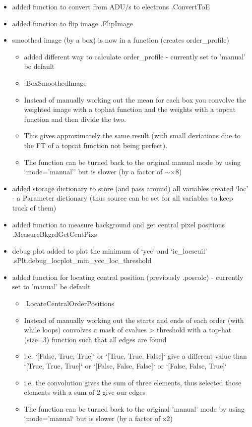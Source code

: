 \begin{itemize}

\item added function to convert from ADU/s to electrons \spirouImage.ConvertToE
    
\item added function to flip image \spirouImage.FlipImage

\item smoothed image (by a box) is now in a function (creates order\_profile)
	\begin{itemize}
	\item added different way to calculate order\_profile - currently set to 'manual' be default
	\item \spirouLOCOR.BoxSmoothedImage 
	\item Instead of manually working out the mean for each box you convolve the weighted image with a tophat function and the weights with a topcat function and then divide the two.
	\item This gives approximately the same result (with small deviations due to the FT of a topcat function not being perfect).
	\item The function can be turned back to the original manual mode by using `mode='manual'' but is slower (by a factor of $\sim\times$8)
	\end{itemize}

\item added storage dictionary to store (and pass around) all variables created `loc' - a Parameter dictionary (thus source can be set for all variables to keep track of them)

\item added function to measure background and get central pixel positions \spirouLOCOR.MeasureBkgrdGetCentPixs

\item debug plot added to plot the minimum of `ycc' and `ic\_locseuil' \spirouPlot.sPlt.debug\_locplot\_min\_ycc\_loc\_threshold

\item added function for locating central position (previously \spirouLOCOR.poscolc) - currently set to 'manual' be default
    \begin{itemize}
    \item \spirouLOCOR.LocateCentralOrderPositions
    \item  Instead of manually working out the starts and ends of each order (with while loops) convolves a mask of cvalues > threshold with a top-hat (size=3) function such that all edges are found
    \item i.e. `[False, True, True]` or `[True, True, False]` give a different value than `[True, True, True]` or `[False, False, False]` or `[False, False, True]`
    \item i.e. the convolution gives the sum of three elements, thus selected those elements with a sum of 2 give our edges
    \item The function can be turned back to the original 'manual' mode by using `mode='manual` but is slower (by a factor of x2)
	\end{itemize}


\end{itemize}

